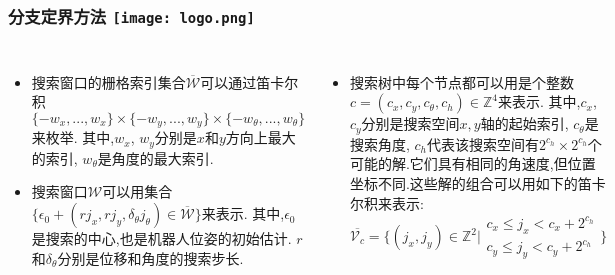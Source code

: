 \begin{comment}

\end{comment}
\begin{frame}
\frametitle{分支定界方法 \hfill \texttt{[image: logo.png]}}

\begin{columns}
	
	\begin{itemize}
		\item 搜索窗口的栅格索引集合$\overline{\mathcal{W}}$可以通过笛卡尔积$\{-w_x, ..., w_x \} \times 
		\{-w_y, ..., w_y \} \times \{-w_\theta, ..., w_\theta \}$来枚举.
		其中,$w_x$, $w_y$分别是$x$和$y$方向上最大的索引, $w_\theta$是角度的最大索引.
		
		
		\vspace{0.3cm} %
		
		\item 搜索窗口$\mathcal{W}$可以用集合$\{\epsilon_0 + (rj_x, rj_y, \delta_\theta j_\theta) \in \overline{\mathcal{W}} \}$来表示.
		其中,$\epsilon_0$是搜索的中心,也是机器人位姿的初始估计. $r$ 和$\delta_\theta$分别是位移和角度的搜索步长.
	\end{itemize}
	
	\begin{itemize}
		\item 搜索树中每个节点都可以用是个整数$c=(c_x, c_y, c_\theta, c_h) \in \mathbb{Z}^4$来表示. 其中,$c_x$, $c_y$分别是搜索空间$x, y$轴的起始索引, $c_{\theta}$是搜索角度, $c_h$代表该搜索空间有$2^{c_h} \times 2^{c_h}$个可能的解.它们具有相同的角速度,但位置坐标不同.这些解的组合可以用如下的笛卡尔积来表示:
		\vspace{0.2cm}
		\begin{equation}
			\overline{\mathcal{V}_c} = \{(j_x, j_y) \in \mathbb{Z}^2 | 
			\begin{matrix}
			c_x \leq j_x < c_x + 2^{c_h} \\
			c_y \leq j_y < c_y + 2^{c_h}
			\end{matrix}
			\}
		\end{equation}
	\end{itemize}
\end{columns}

\end{frame}


